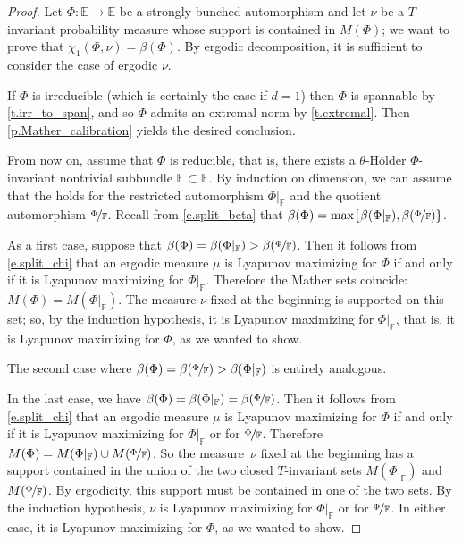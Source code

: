 \documentclass[10pt]{amsart}
\theoremstyle{plain}
\theoremstyle{definition}
\newcommand{\EE}{\mathbb{E}}
\newcommand{\FF}{\mathbb{F}}
\begin{document}
\begin{proof}
Let $\Phi \colon \EE \to \EE$ be a strongly bunched automorphism and let $\nu$ be a $T$\nobreakdash-invariant probability measure whose support is contained in $M(\Phi)$; we want to prove that $\chi_1(\Phi, \nu) = \beta(\Phi)$.
By ergodic decomposition, it is sufficient to consider the case of ergodic $\nu$.

If $\Phi$ is irreducible (which is certainly the case if $d=1$) then $\Phi$ is spannable by \cref{t.irr_to_span}, and so $\Phi$ admits an extremal norm by \cref{t.extremal}. Then \cref{p.Mather_calibration} yields the desired conclusion.

From now on, assume that $\Phi$ is reducible, that is, there exists a $\theta$-Hölder $\Phi$-invariant nontrivial subbundle $\FF \subset \EE$.
By induction on dimension, we can assume that the  holds for the restricted automorphism $\Phi|_{\FF}$ and the quotient automorphism $\nicefrac{\Phi}{\FF}$.
Recall from \eqref{e.split_beta} that $\beta(\Phi) = \max\{ \beta(\Phi|_{\FF}), \beta(\nicefrac{\Phi}{\FF}) \}$.

As a first case, suppose that $\beta(\Phi) = \beta(\Phi|_{\FF}) > \beta(\nicefrac{\Phi}{\FF})$.
Then it follows from \eqref{e.split_chi} that an ergodic measure $\mu$ is Lyapunov maximizing for $\Phi$ if and only if it is Lyapunov maximizing for $\Phi|_{\FF}$.
Therefore the Mather sets coincide: $M(\Phi) = M(\Phi|_{\FF})$.
The measure $\nu$ fixed at the beginning is supported on this set; so, by the induction hypothesis, it is Lyapunov maximizing for $\Phi|_{\FF}$, that is, it is Lyapunov maximizing for $\Phi$, as we wanted to show.

The second case where $\beta(\Phi) = \beta(\nicefrac{\Phi}{\FF}) > \beta(\Phi|_{\FF})$ is entirely analogous.

In the last case, we have $\beta(\Phi) = \beta(\Phi|_{\FF}) = \beta(\nicefrac{\Phi}{\FF})$.
Then it follows from \eqref{e.split_chi} that an ergodic measure $\mu$ is Lyapunov maximizing for $\Phi$ if and only if it is Lyapunov maximizing for $\Phi|_{\FF}$ or for $\nicefrac{\Phi}{\FF}$.
Therefore $M(\Phi) = M(\Phi|_{\FF}) \cup M(\nicefrac{\Phi}{\FF})$.
So the measure~$\nu$ fixed at the beginning has a support contained in the union of the two closed $T$\nobreakdash-invariant sets
$M(\Phi|_{\FF})$ and $M(\nicefrac{\Phi}{\FF})$.
By ergodicity,
this support must be contained in one of the two sets.
By the induction hypothesis, $\nu$ is Lyapunov maximizing for $\Phi|_{\FF}$ or for $\nicefrac{\Phi}{\FF}$.
In either case, it is Lyapunov maximizing for $\Phi$, as we wanted to show.
\end{proof}
\end{document}
